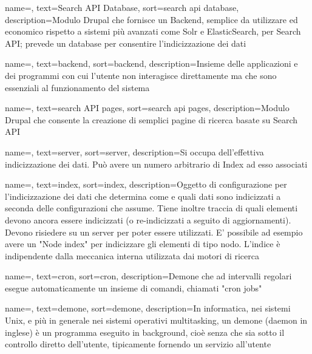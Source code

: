 {
	name=,
	text=Search API Database,
	sort=search api database,
	description={\gls{Modulo} \gls{Drupal} che fornisce un \gls{Backend}, semplice da utilizzare ed economico rispetto a sistemi più avanzati come \gls{Solr} e \gls{ElasticSearch}, per \gls{Search API}; prevede un database per consentire l'indicizzazione dei dati}
}

{
	name=,
	text=backend,
	sort=backend,
	description={Insieme delle applicazioni e dei programmi con cui l'utente non interagisce direttamente ma che sono essenziali al funzionamento del sistema}
}

{
	name=,
	text=search API pages,
	sort=search api pages,
	description={\gls{Modulo} \gls{Drupal} che consente la creazione di semplici pagine di ricerca basate su \gls{Search API}}
}

{
	name=,
	text=server,
	sort=server,
	description={Si occupa dell'effettiva indicizzazione dei dati. Può avere un numero arbitrario di \gls{Index} ad esso associati}
}

{
	name=,
	text=index,
	sort=index,
	description={Oggetto di configurazione per l'indicizzazione dei dati che determina come e quali dati sono indicizzati a seconda delle configurazioni che assume. Tiene inoltre traccia di quali elementi devono ancora essere indicizzati (o re-indicizzati a seguito di aggiornamenti). Devono risiedere su un server per poter essere utilizzati.
		E' possibile ad esempio avere un "Node index" per indicizzare gli elementi di tipo nodo. L'indice è indipendente dalla meccanica interna utilizzata dai motori di ricerca}
}

{
	name=,
	text=cron,
	sort=cron,
	description={\gls{Demone} che ad intervalli regolari esegue automaticamente un insieme di comandi, chiamati "cron jobs"}
}

{
	name=,
	text=demone,
	sort=demone,
	description={In informatica, nei sistemi Unix, e più in generale nei sistemi operativi multitasking, un demone (daemon in inglese) è un programma eseguito in background, cioè senza che sia sotto il controllo diretto dell'utente, tipicamente fornendo un servizio all'utente}
}

